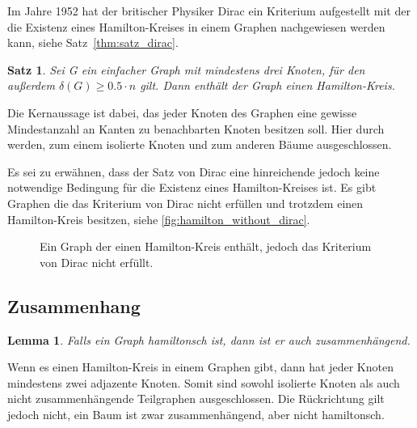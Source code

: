 \documentclass{article}
\newtheorem{mylem}{Lemma}
\newtheorem{mysat}{Satz}
\begin{document}
Im Jahre 1952 hat der britischer Physiker Dirac ein Kriterium aufgestellt mit der die Existenz eines Hamilton-Kreises in einem Graphen nachgewiesen werden kann, siehe Satz~\autoref{thm:satz_dirac}.

\begin{mysat}\label{thm:satz_dirac}
	Sei G ein einfacher Graph mit mindestens drei Knoten, für den außerdem $\delta(G)\geq 0.5\cdot n$ gilt. Dann enthält der Graph einen Hamilton-Kreis.
\end{mysat}

Die Kernaussage ist dabei, das jeder Knoten des Graphen eine gewisse Mindestanzahl an Kanten zu benachbarten Knoten besitzen soll. Hier durch werden, zum einem isolierte Knoten und zum anderen Bäume ausgeschlossen.

Es sei zu erwähnen, dass der Satz von Dirac eine hinreichende jedoch keine notwendige Bedingung für die Existenz eines Hamilton-Kreises ist. Es gibt Graphen die das Kriterium von Dirac nicht erfüllen und trotzdem einen Hamilton-Kreis besitzen, siehe \autoref{fig:hamilton_without_dirac}.

\begin{figure}[h]
	\centering
	\caption{Ein Graph der einen Hamilton-Kreis enthält, jedoch das Kriterium von Dirac nicht erfüllt.}
	\label{fig:hamilton_without_dirac}
\end{figure}


\subsection{Zusammenhang}

\begin{mylem}
	Falls ein Graph hamiltonsch ist, dann ist er auch zusammenhängend.
\end{mylem}

Wenn es einen Hamilton-Kreis in einem Graphen gibt, dann hat jeder Knoten mindestens zwei adjazente Knoten. Somit sind sowohl isolierte Knoten als auch nicht zusammenhängende Teilgraphen ausgeschlossen. Die Rückrichtung gilt jedoch nicht, ein Baum ist zwar zusammenhängend, aber nicht hamiltonsch.
\end{document}
